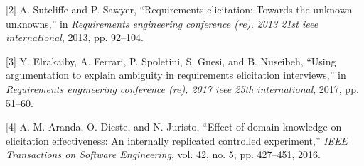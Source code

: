 \documentclass[]{llncs}
\begin{document}
\leavevmode\hypertarget{ref-sutcliffe2013requirements}{}%
{[}2{]} A. Sutcliffe and P. Sawyer, ``Requirements elicitation: Towards
the unknown unknowns,'' in \emph{Requirements engineering conference
(re), 2013 21st ieee international}, 2013, pp. 92--104.

\leavevmode\hypertarget{ref-elrakaiby2017using}{}%
{[}3{]} Y. Elrakaiby, A. Ferrari, P. Spoletini, S. Gnesi, and B.
Nuseibeh, ``Using argumentation to explain ambiguity in requirements
elicitation interviews,'' in \emph{Requirements engineering conference
(re), 2017 ieee 25th international}, 2017, pp. 51--60.

\leavevmode\hypertarget{ref-aranda2016effect}{}%
{[}4{]} A. M. Aranda, O. Dieste, and N. Juristo, ``Effect of domain
knowledge on elicitation effectiveness: An internally replicated
controlled experiment,'' \emph{IEEE Transactions on Software
Engineering}, vol. 42, no. 5, pp. 427--451, 2016.
\end{document}
